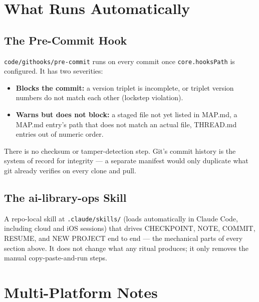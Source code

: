 \documentclass[12pt,letterpaper]{article}
\begin{document}
\section{What Runs Automatically}
\label{sec:hook-detail}

\subsection{The Pre-Commit Hook}

\texttt{code/githooks/pre-commit} runs on every commit once
\texttt{core.hooksPath} is configured. It has two severities:

\begin{itemize}
\item \textbf{Blocks the commit:} a version triplet is incomplete, or
      triplet version numbers do not match each other (lockstep
      violation).
\item \textbf{Warns but does not block:} a staged file not yet listed
      in MAP.md, a MAP.md entry's path that does not match an actual
      file, THREAD.md entries out of numeric order.
\end{itemize}

\begin{mdframed}[style=notebox]
There is no checksum or tamper-detection step. Git's commit history is
the system of record for integrity --- a separate manifest would only
duplicate what git already verifies on every clone and pull.
\end{mdframed}

\subsection{The ai-library-ops Skill}

A repo-local skill at \texttt{.claude/skills/} (loads automatically in
Claude Code, including cloud and iOS sessions) that drives CHECKPOINT,
NOTE, COMMIT, RESUME, and NEW PROJECT end to end --- the mechanical parts
of every section above. It does not change what any ritual produces; it
only removes the manual copy-paste-and-run steps.

\section{Multi-Platform Notes}
\end{document}
